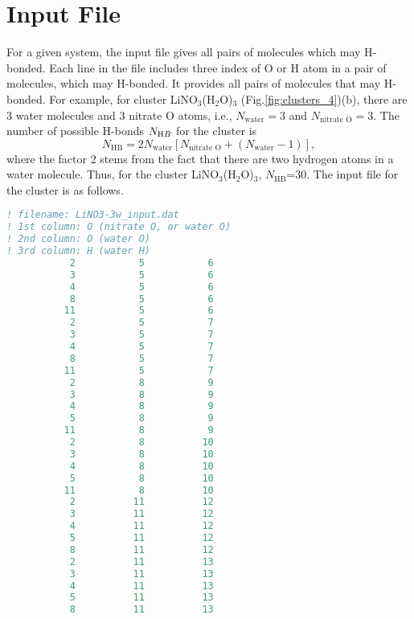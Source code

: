 \section{Input File}
For a given system, the input file gives all pairs of molecules which may H-bonded. Each line in the file 
includes three index of O or H atom in a pair of molecules, which may H-bonded. It provides all pairs of
molecules that may H-bonded. For example, for cluster LiNO$_3$(H$_2$O)$_3$ (Fig.\space\ref{fig:clusters_4})(b), there are 3 
water molecules and 3 nitrate O atoms, i.e., $N_{\text{water}}=3$ and $N_{\text {nitrate O}}=3$.  The number of possible H-bonds $N_{\text HB}$ for the cluster is
\begin{equation}
N_{\text{HB}}=2N_{\text{water}} [N_{\text {nitrate O}}+ (N_{\text{water}}-1)],
\label{N_HB}
\end{equation}
where the factor 2 stems from the fact that there are two hydrogen atoms in a water molecule.
Thus, for the cluster LiNO$_3$(H$_2$O)$_3$, $N_{\text{HB}}$=30. The input file for the cluster is as follows.
\begin{lstlisting}[language=fortran]                  
! filename: LiNO3-3w_input.dat
! 1st column: O (nitrate O, or water O)
! 2nd column: O (water O)
! 3rd column: H (water H)
           2           5           6
           3           5           6
           4           5           6
           8           5           6
          11           5           6
           2           5           7
           3           5           7
           4           5           7
           8           5           7
          11           5           7
           2           8           9
           3           8           9
           4           8           9
           5           8           9
          11           8           9
           2           8          10
           3           8          10
           4           8          10
           5           8          10
          11           8          10
           2          11          12
           3          11          12
           4          11          12
           5          11          12
           8          11          12
           2          11          13
           3          11          13
           4          11          13
           5          11          13
           8          11          13
\end{lstlisting}
